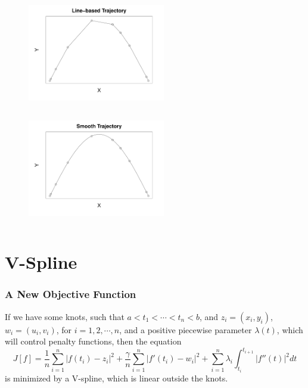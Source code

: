 \documentclass{beamer}
\begin{document}
\begin{frame}
	
\begin{figure}
\vspace*{1cm}
\centering
\includegraphics[width=6cm,height=5cm]{plots/linetrajectory}
\includegraphics[width=6cm,height=5cm]{plots/smoothtrajectory}
\end{figure}

\end{frame}


\section{V-Spline}



\begin{frame}
\frametitle{A New Objective Function}
If we have some knots, such that $a<t_1<\cdots <t_n<b$, and $z_i=(x_i,y_i)$, $w_i=(u_i,v_i)$, for $i=1,2,\cdots,n$, and a positive piecewise parameter $\lambda(t)$, which will control penalty functions, then the equation
\begin{equation}\label{obtractor}
J[f]=\frac{1}{n}\sum_{i=1}^n|f(t_i)-z_i|^2+\frac{\gamma}{n}\sum_{i=1}^{n}|f'(t_i)-w_i|^2+\sum_{i=1}^n\lambda_i\int_{t_i}^{t_{i+1}}|f''(t)|^2 dt
\end{equation}
is minimized by a V-spline, which is linear outside the knots. 
\end{frame}
\end{document}
